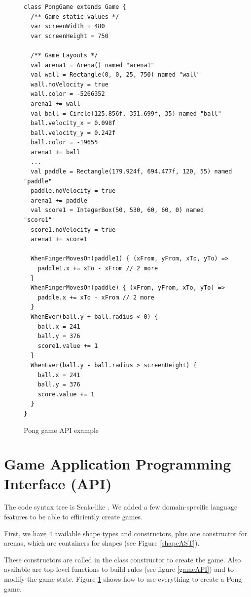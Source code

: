 \documentclass[12pt]{article} %
\begin{document}
\begin{figure}
\begin{lstlisting}
class PongGame extends Game {
  /** Game static values */
  var screenWidth = 480
  var screenHeight = 750

  /** Game Layouts */
  val arena1 = Arena() named "arena1"
  val wall = Rectangle(0, 0, 25, 750) named "wall"
  wall.noVelocity = true
  wall.color = -5266352
  arena1 += wall
  val ball = Circle(125.856f, 351.699f, 35) named "ball"
  ball.velocity_x = 0.098f
  ball.velocity_y = 0.242f
  ball.color = -19655
  arena1 += ball
  ...
  val paddle = Rectangle(179.924f, 694.477f, 120, 55) named "paddle"
  paddle.noVelocity = true
  arena1 += paddle
  val score1 = IntegerBox(50, 530, 60, 60, 0) named "score1"
  score1.noVelocity = true
  arena1 += score1
  
  WhenFingerMovesOn(paddle1) { (xFrom, yFrom, xTo, yTo) =>
    paddle1.x += xTo - xFrom // 2 more
  }
  WhenFingerMovesOn(paddle) { (xFrom, yFrom, xTo, yTo) =>
    paddle.x += xTo - xFrom // 2 more
  }
  WhenEver(ball.y + ball.radius < 0) {
    ball.x = 241
    ball.y = 376
    score1.value += 1
  }
  WhenEver(ball.y - ball.radius > screenHeight) {
    ball.x = 241
    ball.y = 376
    score.value += 1
  }
}
\end{lstlisting}
\caption{Pong game API example \label{PongAPI}}
\end{figure}



\section{Game Application Programming Interface (API)}
The code syntax tree is Scala-like \cite{odersky_overview_2004}.
We added a few domain-specific language features to be able to efficiently
create games.

First, we have 4 available shape types and constructors, plus one constructor
for arenas, which are containers for shapes (see Figure
\ref{shapeAST}).

These constructors are called in the class constructor to create the
game. Also available are top-level functions to build rules (see figure
\ref{gameAPI}) and to modify the game state.
Figure \ref{PongAPI} shows how to use everything to create a Pong game.
\end{document}
